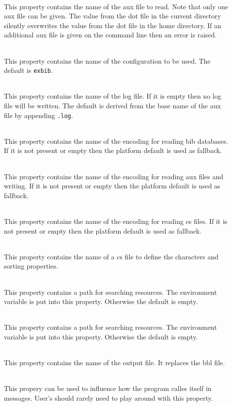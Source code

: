 \begin{description}
\item[] \ \\
  This property contains the name of the aux file to read. Note that
  only one aux file can be given. The value from the dot file in the
  current directory silently overwrites the value from the dot file in
  the home directory. If an additional aux file is given on the
  command line then an error is raised.
\item[] \ \\
  This property contains the name of the configuration to be used. The
  default is \texttt{exbib}.
\item[] \ \\
  This property contains the name of the log file. If it is empty then
  no log file will be written. The default is derived from the base
  name of the aux file by appending \texttt{.log}.
\item[] \ \\
  This property contains the name of the encoding for reading bib
  databases. If it is not present or empty then the platform default
  is used as fallback.
\item[] \ \\
  This property contains the name of the encoding for reading aux
  files and writing. If it is not present or empty then the platform
  default is used as fallback.
\item[] \ \\
  This property contains the name of the encoding for reading cs
  files. If it is not present or empty then the platform default is
  used as fallback.
\item[] \ \\
  This property contains the name of a cs file to define the
  characters and sorting properties.
\item[] \ \\
  This property contains a path for searching resources. The
  environment variable  is put into this property.
  Otherwise the default is empty.
\item[]  \ \\
  This property contains a path for searching resources. The
  environment variable  is put into this property.
  Otherwise the default is empty.
\item[] \ \\
  This property contains the name of the output file. It replaces the
  bbl file.
\item[] \ \\
  This propery can be used to influence how the program calles itself
  in messages. User's should rarely need to play around with this
  property.
\end{description}

